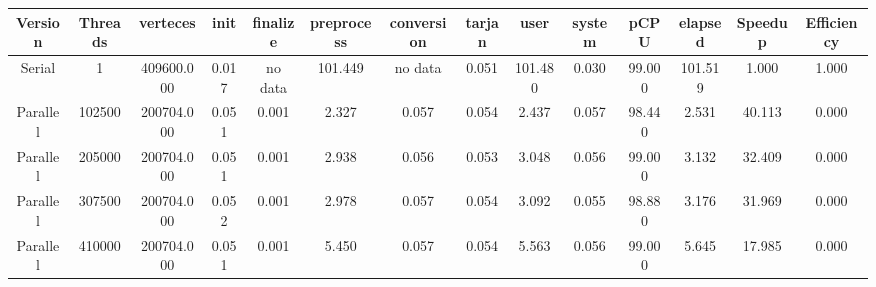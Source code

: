 \begin{tabular}{|c|c|c|c|c|c|c|c|c|c|c|c|c|c|}
\toprule
 Version &  Threads &   verteces &  init & finalize &  preprocess & conversion &  tarjan &    user &  system &   pCPU &  elapsed &  Speedup &  Efficiency \\
\midrule
  Serial &        1 & 409600.000 & 0.017 &  no data &     101.449 &    no data &   0.051 & 101.480 &   0.030 & 99.000 &  101.519 &    1.000 &       1.000 \\
Parallel &   102500 & 200704.000 & 0.051 &    0.001 &       2.327 &      0.057 &   0.054 &   2.437 &   0.057 & 98.440 &    2.531 &   40.113 &       0.000 \\
Parallel &   205000 & 200704.000 & 0.051 &    0.001 &       2.938 &      0.056 &   0.053 &   3.048 &   0.056 & 99.000 &    3.132 &   32.409 &       0.000 \\
Parallel &   307500 & 200704.000 & 0.052 &    0.001 &       2.978 &      0.057 &   0.054 &   3.092 &   0.055 & 98.880 &    3.176 &   31.969 &       0.000 \\
Parallel &   410000 & 200704.000 & 0.051 &    0.001 &       5.450 &      0.057 &   0.054 &   5.563 &   0.056 & 99.000 &    5.645 &   17.985 &       0.000 \\
\bottomrule
\end{tabular}
